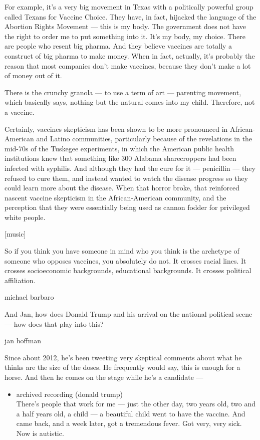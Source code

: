 For example, it's a very big movement in Texas with a politically
powerful group called Texans for Vaccine Choice. They have, in fact,
hijacked the language of the Abortion Rights Movement --- this is my
body. The government does not have the right to order me to put
something into it. It's my body, my choice. There are people who resent
big pharma. And they believe vaccines are totally a construct of big
pharma to make money. When in fact, actually, it's probably the reason
that most companies don't make vaccines, because they don't make a lot
of money out of it.

There is the crunchy granola --- to use a term of art --- parenting
movement, which basically says, nothing but the natural comes into my
child. Therefore, not a vaccine.

Certainly, vaccines skepticism has been shown to be more pronounced in
African-American and Latino communities, particularly because of the
revelations in the mid-70s of the Tuskegee experiments, in which the
American public health institutions knew that something like 300 Alabama
sharecroppers had been infected with syphilis. And although they had the
cure for it --- penicillin --- they refused to cure them, and instead
wanted to watch the disease progress so they could learn more about the
disease. When that horror broke, that reinforced nascent vaccine
skepticism in the African-American community, and the perception that
they were essentially being used as cannon fodder for privileged white
people.

{[}music{]}

So if you think you have someone in mind who you think is the archetype
of someone who opposes vaccines, you absolutely do not. It crosses
racial lines. It crosses socioeconomic backgrounds, educational
backgrounds. It crosses political affiliation.

michael barbaro

And Jan, how does Donald Trump and his arrival on the national political
scene --- how does that play into this?

jan hoffman

Since about 2012, he's been tweeting very skeptical comments about what
he thinks are the size of the doses. He frequently would say, this is
enough for a horse. And then he comes on the stage while he's a
candidate ---

\begin{itemize}
\tightlist
\item
  archived recording (donald trump)\\
  There's people that work for me --- just the other day, two years old,
  two and a half years old, a child --- a beautiful child went to have
  the vaccine. And came back, and a week later, got a tremendous fever.
  Got very, very sick. Now is autistic.
\end{itemize}


